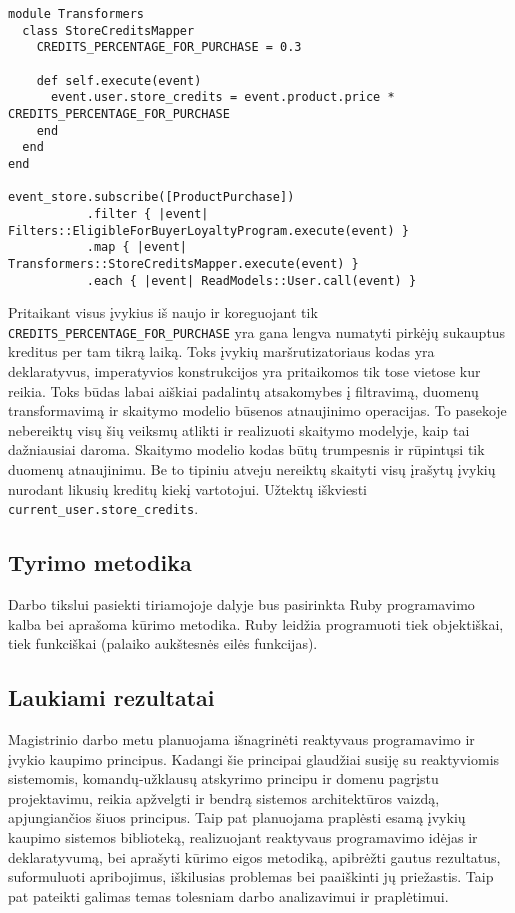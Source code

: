 \begin{lstlisting}[]
module Transformers
  class StoreCreditsMapper
    CREDITS_PERCENTAGE_FOR_PURCHASE = 0.3

    def self.execute(event)
      event.user.store_credits = event.product.price * CREDITS_PERCENTAGE_FOR_PURCHASE
    end
  end
end

event_store.subscribe([ProductPurchase])
           .filter { |event| Filters::EligibleForBuyerLoyaltyProgram.execute(event) }
           .map { |event| Transformers::StoreCreditsMapper.execute(event) }
           .each { |event| ReadModels::User.call(event) }
\end{lstlisting}

Pritaikant visus įvykius iš naujo ir koreguojant tik \lstinline|CREDITS_PERCENTAGE_FOR_PURCHASE| yra gana lengva numatyti pirkėjų sukauptus kreditus per tam tikrą laiką. Toks įvykių maršrutizatoriaus kodas yra deklaratyvus, imperatyvios konstrukcijos yra pritaikomos tik tose vietose kur reikia. Toks būdas labai aiškiai padalintų atsakomybes į filtravimą, duomenų transformavimą ir skaitymo modelio būsenos atnaujinimo operacijas. To pasekoje nebereiktų visų šių veiksmų atlikti ir realizuoti skaitymo modelyje, kaip tai dažniausiai daroma. Skaitymo modelio kodas būtų trumpesnis ir rūpintųsi tik duomenų atnaujinimu. Be to tipiniu atveju nereiktų skaityti visų įrašytų įvykių nurodant likusių kreditų kiekį vartotojui. Užtektų iškviesti \lstinline|current_user.store_credits|.

\subsection{Tyrimo metodika}

    Darbo tikslui pasiekti tiriamojoje dalyje bus pasirinkta Ruby programavimo kalba bei aprašoma kūrimo metodika. Ruby leidžia programuoti tiek objektiškai, tiek funkciškai (palaiko aukštesnės eilės funkcijas).

\subsection{Laukiami rezultatai}

    Magistrinio darbo metu planuojama išnagrinėti reaktyvaus programavimo ir įvykio kaupimo principus. Kadangi šie principai glaudžiai susiję su reaktyviomis sistemomis, komandų-užklausų atskyrimo principu ir domenu pagrįstu projektavimu, reikia apžvelgti ir bendrą sistemos architektūros vaizdą, apjungiančios šiuos principus. Taip pat planuojama praplėsti esamą įvykių kaupimo sistemos biblioteką, realizuojant reaktyvaus programavimo idėjas ir deklaratyvumą, bei aprašyti kūrimo eigos metodiką, apibrėžti gautus rezultatus, suformuluoti apribojimus, iškilusias problemas bei paaiškinti jų priežastis. Taip pat pateikti galimas temas tolesniam darbo analizavimui ir praplėtimui.
